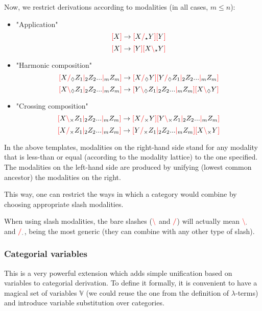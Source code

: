 \documentclass[main.tex]{subfiles}
\begin{document}
Now, we restrict derivations according to modalities (in all cases, $m \leq n$):
\begin{itemize}
    \item "Application"
        \[ \lb X \rb \rightarrow \lb X \rc_\modstar Y \rb \lb Y \rb \]
        \[ \lb X \rb \rightarrow \lb Y \rb \lb X \lc_\modstar Y \rb \]
    \item "Harmonic composition"
        \[ \lb X \rc_\modr Z_1 \mc_2 Z_2 ... \mc_m Z_m \rb \rightarrow \lb X \rc_\modr Y \rb \lb Y \rc_\modr Z_1 \mc_2 Z_2 ... \mc_m Z_m \rb \]
        \[ \lb X \lc_\modr Z_1 \mc_2 Z_2 ... \mc_m Z_m \rb \rightarrow \lb Y \lc_\modr Z_1 \mc_2 Z_2 ... \mc_m Z_m \rb \lb X \lc_\modr Y \rb \]
    \item "Crossing composition"
        \[ \lb X \lc_\modx Z_1 \mc_2 Z_2 ... \mc_m Z_m \rb \rightarrow \lb X \rc_\modx Y \rb \lb Y \lc_\modx Z_1 \mc_2 Z_2 ... \mc_m Z_m \rb \]
        \[ \lb X \rc_\modx Z_1 \mc_2 Z_2 ... \mc_m Z_m \rb \rightarrow \lb Y \rc_\modx Z_1 \mc_2 Z_2 ... \mc_m Z_m \rb \lb X \lc_\modx Y \rb \]
\end{itemize}

In the above templates, modalities on the right-hand side stand for any
modality that is less-than or equal (according to the modality lattice)
to the one specified. The modalities on the left-hand side are produced by
unifying (lowest common ancestor) the modalities on the right.


This way, one can restrict the ways in which a category would
combine by choosing appropriate slash modalities.

When using slash modalities, the bare slashes ($\lc$ and $\rc$) will actually
mean $\lc_\moddot$ and $\rc_\moddot$, being the most generic (they
can combine with any other type of slash).

\subsubsection{Categorial variables}
This is a very powerful extension which adds simple unification based on variables
to categorial derivation. To define it formally, it is convenient to have a
magical set of variables $\mathbb{V}$ (we could reuse the one from the definition
of $\lambda$-terms)
and introduce variable substitution over categories.
\end{document}
